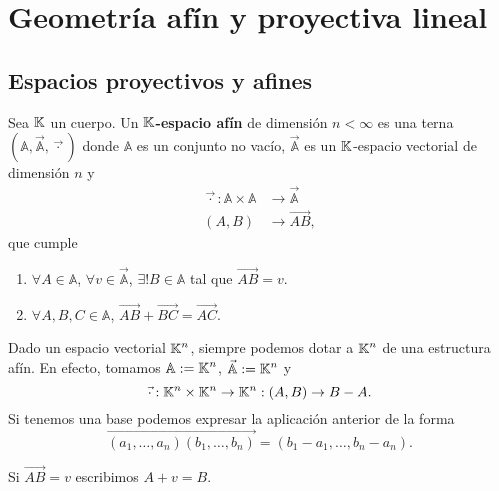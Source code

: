\chapter{Geometría afín y proyectiva lineal}
\section{Espacios proyectivos y afines}
\begin{definition}
	Sea $\displaystyle \mathbb{K} $ un cuerpo. Un $\displaystyle \mathbb{K} $\textbf{-espacio afín} de dimensión $\displaystyle n < \infty $ es una terna $\displaystyle \left(\mathbb{A}, \vec{\mathbb{A}}, \vec{ \cdot}\right) $ donde $\displaystyle \mathbb{A} $ es un conjunto no vacío, $\displaystyle \vec{\mathbb{A}} $ es un $\displaystyle \mathbb{K} $-espacio vectorial de dimensión $\displaystyle n $ y 
	\[
	\begin{split}
		\vec{ \cdot} : \mathbb{A} \times \mathbb{A} & \to \vec{\mathbb{A}} \\
		\left(A,B\right) & \to \overrightarrow{AB},
	\end{split}
	\]
	que cumple 
	\begin{enumerate}
	\item $\displaystyle \forall A \in \mathbb{A} $, $\displaystyle \forall v \in \vec{\mathbb{A}} $, $\displaystyle \exists ! B \in \mathbb{A} $ tal que $\displaystyle \overrightarrow{AB} = v $. 
	\item $\displaystyle \forall A,B,C \in \mathbb{A} $, $\displaystyle \overrightarrow{AB} + \overrightarrow{BC} = \overrightarrow{AC} $.
	\end{enumerate}
\end{definition}
\begin{eg}
Dado un espacio vectorial $\displaystyle \mathbb{K}^{n} $, siempre podemos dotar a $\displaystyle \mathbb{K}^{n} $ de una estructura afín. En efecto, tomamos $\displaystyle \mathbb{A} : = \mathbb{K}^{n} $, $\displaystyle \vec{\mathbb{A}} := \mathbb{K}^{n}	$ y 
\[ \vec{ \cdot } : \mathbb{K}^{n} \times \mathbb{K}^{n} \to \mathbb{K}^{n} : \left(A,B\right) \to B - A .\]
Si tenemos una base podemos expresar la aplicación anterior de la forma
\[\overrightarrow{\left(a_{1}, \ldots, a_{n}\right)\left(b_{1}, \ldots, b_{n}\right)} = \left(b_{1}-a_{1}, \ldots, b_{n}-a_{n}\right) .\]
\end{eg}
\begin{notation}
Si $\displaystyle \overrightarrow{AB} = v $ escribimos $\displaystyle A + v = B $.
\end{notation}
